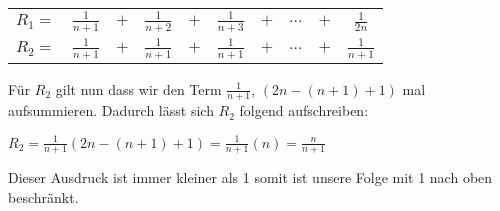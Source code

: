 \documentclass[18pt,a4paper]{article}
\begin{document}
\begin{center}
\begin{tabular}{cccccccccc}
	\doublespacing
	$R_1 =$&$\frac{1}{n+1}$&$+$&$\frac{1}{n+2}$&$+$&$\frac{1}{n+3}$&$+$& $\dots$&$+$&$\frac{1}{2n}$  \\ 
	$R_2 =$&$\frac{1}{n+1}$&$+$&$\frac{1}{n+1}$&$+$& $\frac{1}{n+1}$&$+$&$\dots$&$+$&$\frac{1}{n+1}$ \\
\end{tabular} 
\end{center}

\noindent F\"ur $R_2$ gilt nun dass wir den Term $\frac{1}{n+1}$, $(2n - (n+1) + 1)$ mal aufsummieren. Dadurch l\"asst sich $R_2$ folgend aufschreiben:
\begin{center}
$R_2 = \frac{1}{n+1}(2n - (n+1) + 1) = \frac{1}{n+1}(n) = \frac{n}{n+1}$
\end{center}
Dieser Ausdruck ist immer kleiner als 1 somit ist unsere Folge mit 1 nach oben beschr\"ankt.
\end{document}
